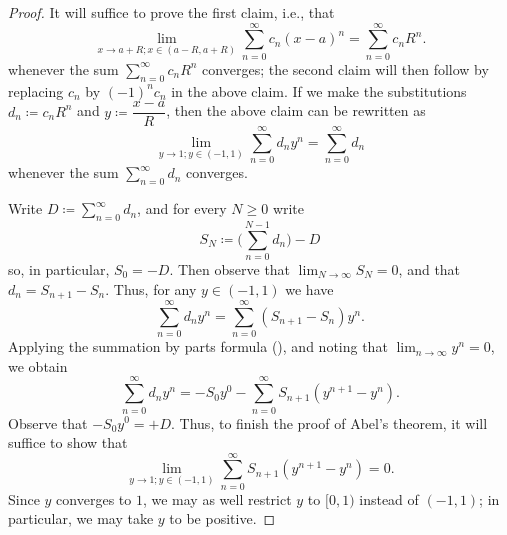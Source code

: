\begin{proof}
  It will suffice to prove the first claim, i.e., that
  \[
    \lim_{x \to a + R ; x \in (a - R, a + R)} \sum_{n = 0}^\infty c_n (x - a)^n = \sum_{n = 0}^\infty c_n R^n.
  \]
  whenever the sum \(\sum_{n = 0}^\infty c_n R^n\) converges;
  the second claim will then follow by replacing \(c_n\) by \((-1)^n c_n\) in the above claim.
  If we make the substitutions \(d_n \coloneqq c_n R^n\) and \(y \coloneqq \dfrac{x - a}{R}\), then the above claim can be rewritten as
  \[
    \lim_{y \to 1 ; y \in (-1, 1)} \sum_{n = 0}^\infty d_n y^n = \sum_{n = 0}^\infty d_n
  \]
  whenever the sum \(\sum_{n = 0}^\infty d_n\) converges.

  Write \(D \coloneqq \sum_{n = 0}^\infty d_n\), and for every \(N \geq 0\) write
  \[
    S_N \coloneqq \bigg(\sum_{n = 0}^{N - 1} d_n\bigg) - D
  \]
  so, in particular, \(S_0 = -D\).
  Then observe that \(\lim_{N \to \infty} S_N = 0\), and that \(d_n = S_{n + 1} - S_n\).
  Thus, for any \(y \in (-1, 1)\) we have
  \[
    \sum_{n = 0}^\infty d_n y^n = \sum_{n = 0}^\infty (S_{n + 1} - S_n) y^n.
  \]
  Applying the summation by parts formula (), and noting that \(\lim_{n \to \infty} y^n = 0\), we obtain
  \[
    \sum_{n = 0}^\infty d_n y^n = - S_0 y^0 - \sum_{n = 0}^\infty S_{n + 1} (y^{n + 1} - y^n).
  \]
  Observe that \(- S_0 y^0 = +D\).
  Thus, to finish the proof of Abel's theorem,
  it will suffice to show that
  \[
    \lim_{y \to 1 ; y \in (-1, 1)} \sum_{n = 0}^\infty S_{n + 1} (y^{n + 1} - y^n) = 0.
  \]
  Since \(y\) converges to \(1\), we may as well restrict \(y\) to \([0, 1)\) instead of \((-1, 1)\);
  in particular, we may take \(y\) to be positive.


\end{proof}
